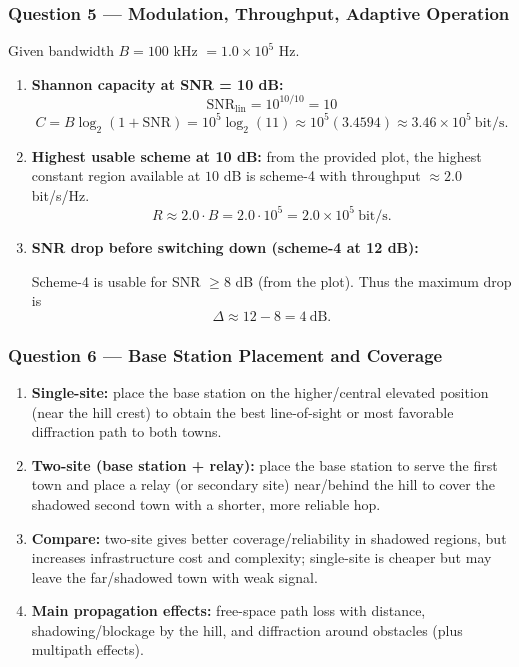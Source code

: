 \documentclass[11pt,a4paper]{article}
\begin{document}
\subsubsection*{Question 5 --- Modulation, Throughput, Adaptive Operation}
Given bandwidth $B=100$ kHz $=1.0\times 10^5$ Hz.

\begin{enumerate}[label=\alph*.]
    \item \textbf{Shannon capacity at SNR = 10 dB:}
    \[
    \mathrm{SNR}_{\text{lin}} = 10^{10/10}=10
    \]
    \[
    C = B\log_2(1+\mathrm{SNR}) = 10^5\log_2(11)
    \approx 10^5(3.4594)\approx 3.46\times 10^5\ \text{bit/s}.
    \]
    \item \textbf{Highest usable scheme at 10 dB:} from the provided plot, the highest constant region available at $10$ dB is scheme-4 with throughput $\approx 2.0$ bit/s/Hz.
    \[
    R \approx 2.0\cdot B = 2.0\cdot 10^5 = 2.0\times 10^5\ \text{bit/s}.
    \]
    \item \textbf{SNR drop before switching down (scheme-4 at 12 dB):}
    
    Scheme-4 is usable for SNR $\ge 8$ dB (from the plot). Thus the maximum drop is
    \[
    \Delta \approx 12 - 8 = 4\ \text{dB}.
    \]
\end{enumerate}

\subsubsection*{Question 6 --- Base Station Placement and Coverage}
\begin{enumerate}[label=\alph*.]
    \item \textbf{Single-site:} place the base station on the higher/central elevated position (near the hill crest) to obtain the best line-of-sight or most favorable diffraction path to both towns.
    \item \textbf{Two-site (base station + relay):} place the base station to serve the first town and place a relay (or secondary site) near/behind the hill to cover the shadowed second town with a shorter, more reliable hop.
    \item \textbf{Compare:} two-site gives better coverage/reliability in shadowed regions, but increases infrastructure cost and complexity; single-site is cheaper but may leave the far/shadowed town with weak signal.
    \item \textbf{Main propagation effects:} free-space path loss with distance, shadowing/blockage by the hill, and diffraction around obstacles (plus multipath effects).
\end{enumerate}
\end{document}
